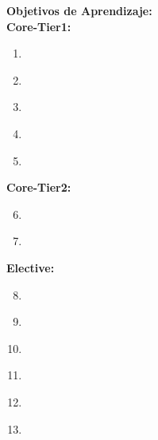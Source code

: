 \noindent \textbf{Objetivos de Aprendizaje:}\\
\noindent \textbf{Core-Tier1:}
\begin{enumerate}
	\setcounter{enumi}{0}
	\item \IASDefensiveProgrammingLOExplainWhyAnd\xspace[\IASDefensiveProgrammingLOExplainWhyAndLevel]\label{sec:BOK:IASDefensiveProgrammingLOExplainWhyAnd}
	\item \IASDefensiveProgrammingLOExplainWhyChoose\xspace[\IASDefensiveProgrammingLOExplainWhyChooseLevel]\label{sec:BOK:IASDefensiveProgrammingLOExplainWhyChoose}
	\item \IASDefensiveProgrammingLOClassify\xspace[\IASDefensiveProgrammingLOClassifyLevel]\label{sec:BOK:IASDefensiveProgrammingLOClassify}
	\item \IASDefensiveProgrammingLODemonstrateUsing\xspace[\IASDefensiveProgrammingLODemonstrateUsingLevel]\label{sec:BOK:IASDefensiveProgrammingLODemonstrateUsing}
	\item \IASDefensiveProgrammingLODemonstrateTheGraceful\xspace[\IASDefensiveProgrammingLODemonstrateTheGracefulLevel]\label{sec:BOK:IASDefensiveProgrammingLODemonstrateTheGraceful}
\end{enumerate}
\noindent \textbf{Core-Tier2:}
\begin{enumerate}
	\setcounter{enumi}{5}
	\item \IASDefensiveProgrammingLOExplainTheMisusing\xspace[\IASDefensiveProgrammingLOExplainTheMisusingLevel]\label{sec:BOK:IASDefensiveProgrammingLOExplainTheMisusing}
	\item \IASDefensiveProgrammingLODiscussTheUpdate\xspace[\IASDefensiveProgrammingLODiscussTheUpdateLevel]\label{sec:BOK:IASDefensiveProgrammingLODiscussTheUpdate}
\end{enumerate}
\noindent \textbf{Elective:}
\begin{enumerate}
	\setcounter{enumi}{7}
	\item \IASDefensiveProgrammingLOListExamples\xspace[\IASDefensiveProgrammingLOListExamplesLevel]\label{sec:BOK:IASDefensiveProgrammingLOListExamples}
	\item \IASDefensiveProgrammingLOExplainTheRandom\xspace[\IASDefensiveProgrammingLOExplainTheRandomLevel]\label{sec:BOK:IASDefensiveProgrammingLOExplainTheRandom}
	\item \IASDefensiveProgrammingLOExplainTheOfDetecting\xspace[\IASDefensiveProgrammingLOExplainTheOfDetectingLevel]\label{sec:BOK:IASDefensiveProgrammingLOExplainTheOfDetecting}
	\item \IASDefensiveProgrammingLODemonstrateHowTested\xspace[\IASDefensiveProgrammingLODemonstrateHowTestedLevel]\label{sec:BOK:IASDefensiveProgrammingLODemonstrateHowTested}
	\item \IASDefensiveProgrammingLOUseStatic\xspace[\IASDefensiveProgrammingLOUseStaticLevel]\label{sec:BOK:IASDefensiveProgrammingLOUseStatic}
	\item \IASDefensiveProgrammingLODescribeHowIsProtect\xspace[\IASDefensiveProgrammingLODescribeHowIsProtectLevel]\label{sec:BOK:IASDefensiveProgrammingLODescribeHowIsProtect}
\end{enumerate}


